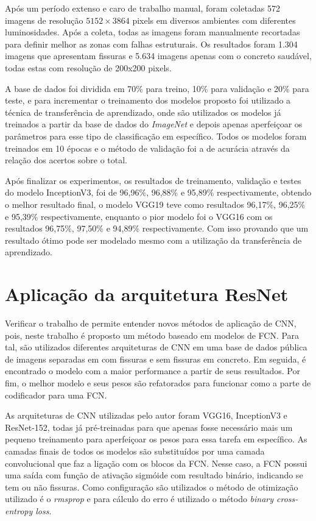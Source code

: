 Após um período extenso e caro de trabalho manual, foram coletadas 572 imagens de resolução $5152 \times 3864$ pixels em diversos ambientes com diferentes luminosidades. 
Após a coleta, todas as imagens foram manualmente recortadas para definir melhor as zonas com falhas estruturais. 
Os resultados foram 1.304 imagens que apresentam fissuras e 5.634 imagens apenas com o concreto saudável, todas estas com resolução de 200x200 pixels.

A base de dados foi dividida  em 70\% para treino, 10\% para validação e 20\% para teste, e para incrementar o treinamento dos modelos proposto foi utilizado a técnica de transferência de aprendizado, onde são utilizados os modelos já treinados a partir da base de dados do \textit{ImageNet} \cite{deng2009imagenet} e depois apenas aperfeiçoar os parâmetros para esse tipo de classificação em específico.
Todos os modelos foram treinados em 10 épocas e o método de validação foi a de acurácia através da relação dos acertos sobre o total.

Após finalizar os experimentos, os resultados de treinamento, validação e testes do modelo InceptionV3, foi de 96,96\%, 96,88\% e 95,89\% respectivamente, obtendo o melhor resultado final, o modelo VGG19 teve como resultados 96,17\%, 96,25\% e 95,39\% respectivamente, enquanto o pior modelo foi o VGG16 com os resultados 96,75\%,  97,50\% e 94,89\% respectivamente.
Com isso provando que um resultado ótimo pode ser modelado mesmo com a utilização da transferência de aprendizado.

\section{Aplicação da arquitetura ResNet}

Verificar o trabalho de  permite entender novos métodos de aplicação de CNN, pois, neste trabalho é proposto um método baseado em modelos de FCN.
Para tal, são utilizados diferentes arquiteturas de CNN em uma base de dados pública de imagens separadas em com fissuras e sem fissuras em concreto.
Em seguida, é encontrado o modelo com a maior performance a partir de seus resultados.
Por fim, o melhor modelo e seus pesos são refatorados para funcionar como a parte de codificador para uma FCN.

As arquiteturas de CNN utilizadas pelo autor foram VGG16, InceptionV3 e ResNet-152, todas já pré-treinadas para que apenas fosse necessário mais um pequeno treinamento para aperfeiçoar os pesos para essa tarefa em específico. 
As camadas finais de todos os modelos são substituídos por uma camada convolucional que faz a ligação com os blocos da FCN.
Nesse caso, a FCN possui uma saída com função de ativação sigmóide com resultado binário, indicando se tem ou não fissuras. 
Como configuração são utilizados o método de otimização utilizado é o \textit{rmsprop} \cite{tieleman2012lecture} e para cálculo  do erro é utilizado o método \textit{binary cross-entropy loss}.

